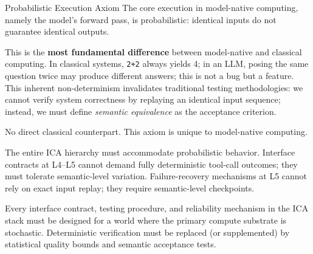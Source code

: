 \begin{axiombox}{\theaxiom\enspace Probabilistic Execution Axiom}
The core execution in model-native computing, namely the model's forward pass, is probabilistic: identical inputs do not guarantee identical outputs.
\end{axiombox}
\begin{description}[style=nextline,leftmargin=2em,font=\bfseries]
\item[Intuition.] This is the \textbf{most fundamental difference} between model-native and classical computing. In classical systems, \texttt{2+2} always yields 4; in an LLM, posing the same question twice may produce different answers; this is not a bug but a feature. This inherent non-determinism invalidates traditional testing methodologies: we cannot verify system correctness by replaying an identical input sequence; instead, we must define \textit{semantic equivalence} as the acceptance criterion.
\item[Classical source.] No direct classical counterpart. This axiom is unique to model-native computing.
\item[ICA embodiment.] The entire ICA hierarchy must accommodate probabilistic behavior. Interface contracts at L4--L5 cannot demand fully deterministic tool-call outcomes; they must tolerate semantic-level variation. Failure-recovery mechanisms at L5 cannot rely on exact input replay; they require semantic-level checkpoints.
\item[Design implication.] Every interface contract, testing procedure, and reliability mechanism in the ICA stack must be designed for a world where the primary compute substrate is stochastic. Deterministic verification must be replaced (or supplemented) by statistical quality bounds and semantic acceptance tests.
\end{description}

